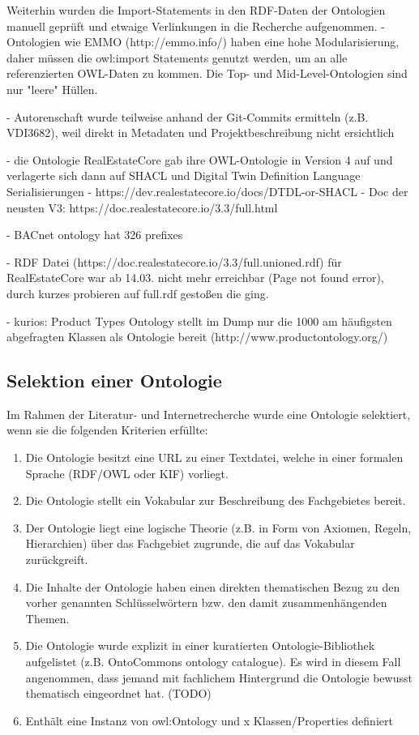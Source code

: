 \documentclass{article}
\begin{document}
Weiterhin wurden die Import-Statements in den RDF-Daten der Ontologien manuell geprüft und etwaige Verlinkungen in die Recherche aufgenommen.
- Ontologien wie EMMO (http://emmo.info/) haben eine hohe Modularisierung, daher müssen die owl:import Statements genutzt werden, um an alle referenzierten OWL-Daten zu kommen. Die Top- und Mid-Level-Ontologien sind nur "leere" Hüllen.

- Autorenschaft wurde teilweise anhand der Git-Commits ermitteln (z.B. VDI3682), weil direkt in Metadaten und Projektbeschreibung nicht ersichtlich

- die Ontologie RealEstateCore gab ihre OWL-Ontologie in Version 4 auf und verlagerte sich dann auf SHACL und Digital Twin Definition Language Serialisierungen
  - https://dev.realestatecore.io/docs/DTDL-or-SHACL
  - Doc der neusten V3: https://doc.realestatecore.io/3.3/full.html

- BACnet ontology hat 326 prefixes

- RDF Datei (https://doc.realestatecore.io/3.3/full.unioned.rdf) für RealEstateCore war ab 14.03. nicht mehr erreichbar (Page not found error),
  durch kurzes probieren auf full.rdf gestoßen die ging.

- kurios: Product Types Ontology stellt im Dump nur die 1000 am häufigsten abgefragten Klassen als Ontologie bereit (http://www.productontology.org/)

\subsection{Selektion einer Ontologie}

Im Rahmen der Literatur- und Internetrecherche wurde eine Ontologie selektiert, wenn sie die folgenden Kriterien erfüllte:

\begin{enumerate}
    \item Die Ontologie besitzt eine URL zu einer Textdatei, welche in einer formalen Sprache (RDF/OWL oder KIF) vorliegt.
    \item Die Ontologie stellt ein Vokabular zur Beschreibung des Fachgebietes bereit.
    \item Der Ontologie liegt eine logische Theorie (z.B. in Form von Axiomen, Regeln, Hierarchien) über das Fachgebiet zugrunde, die auf das Vokabular zurückgreift.
    \item Die Inhalte der Ontologie haben einen direkten thematischen Bezug zu den vorher genannten Schlüsselwörtern bzw. den damit zusammenhängenden Themen.
    \item Die Ontologie wurde explizit in einer kuratierten Ontologie-Bibliothek aufgelistet (z.B. OntoCommons ontology catalogue). Es wird in diesem Fall angenommen, dass jemand mit fachlichem Hintergrund die Ontologie bewusst thematisch eingeordnet hat. (TODO)
    \item Enthält eine Instanz von owl:Ontology und x Klassen/Properties definiert
\end{enumerate}
\end{document}
